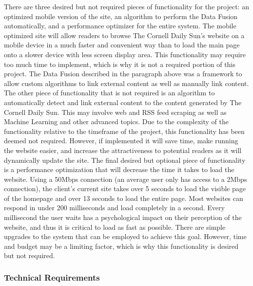 \documentclass[10pt]{article} %
\begin{document}
There are three desired but not required pieces of functionality for the project: an optimized mobile version of the site, an algorithm to perform the Data Fusion automatically, and a performance optimizer for the entire system. The mobile optimized site will allow readers to browse The Cornell Daily Sun’s website on a mobile device in a much faster and convenient way than to load the main page onto a slower device with less screen display area. This functionality may require too much time to implement, which is why it is not a required portion of this project. The Data Fusion described in the paragraph above was a framework to allow custom algorithms to link external content as well as manually link content. The other piece of functionality that is not required is an algorithm to automatically detect and link external content to the content generated by The Cornell Daily Sun. This may involve web and RSS feed scraping as well as Machine Learning and other advanced topics. Due to the complexity of the functionality relative to the timeframe of the project, this functionality has been deemed not required. However, if implemented it will save time, make running the website easier, and increase the attractiveness to potential readers as it will dynamically update the site. The final desired but optional piece of functionality is a performance optimization that will decrease the time it takes to load the website. Using a 50Mbps connection (an average user only has access to a 2Mbps connection), the client’s current site takes over 5 seconds to load the visible page of the homepage and over 13 seconds to load the entire page. Most websites can respond in under 200 milliseconds and load completely in a second. Every millisecond the user waits has a psychological impact on their perception of the website, and thus it is critical to load as fast as possible. There are simple upgrades to the system that can be employed to achieve this goal. However, time and budget may be a limiting factor, which is why this functionality is desired but not required.

\subsubsection{Technical Requirements}
\end{document}
